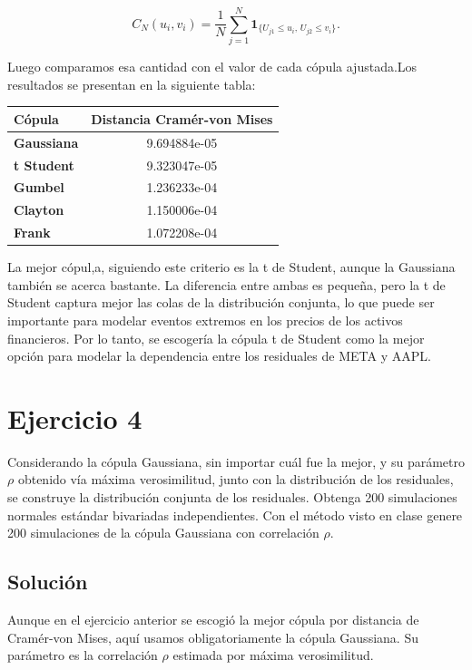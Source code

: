 \documentclass[
]{article}
\begin{document}
\[
C_N(u_i,v_i)=\frac{1}{N}\sum_{j=1}^{N}\mathbf{1}_{\{U_{j1}\leq u_i,\,U_{j2}\leq v_i\}}.
\]

Luego comparamos esa cantidad con el valor de cada cópula ajustada.Los
resultados se presentan en la siguiente tabla:

\begin{longtable}[]{@{}lc@{}}
\toprule\noalign{}
Cópula & Distancia Cramér-von Mises \\
\midrule\noalign{}
\endhead
\bottomrule\noalign{}
\endlastfoot
\textbf{Gaussiana} & 9.694884e-05 \\
\textbf{t Student} & 9.323047e-05 \\
\textbf{Gumbel} & 1.236233e-04 \\
\textbf{Clayton} & 1.150006e-04 \\
\textbf{Frank} & 1.072208e-04 \\
\end{longtable}

La mejor cópul,a, siguiendo este criterio es la t de Student, aunque la
Gaussiana también se acerca bastante. La diferencia entre ambas es
pequeña, pero la t de Student captura mejor las colas de la distribución
conjunta, lo que puede ser importante para modelar eventos extremos en
los precios de los activos financieros. Por lo tanto, se escogería la
cópula t de Student como la mejor opción para modelar la dependencia
entre los residuales de META y AAPL.

\section{Ejercicio 4}\label{ejercicio-4}

Considerando la cópula Gaussiana, sin importar cuál fue la mejor, y su
parámetro \(\rho\) obtenido vía máxima verosimilitud, junto con la
distribución de los residuales, se construye la distribución conjunta de
los residuales. Obtenga 200 simulaciones normales estándar bivariadas
independientes. Con el método visto en clase genere 200 simulaciones de
la cópula Gaussiana con correlación \(\rho\).

\subsection{Solución}\label{soluciuxf3n-3}

Aunque en el ejercicio anterior se escogió la mejor cópula por distancia
de Cramér-von Mises, aquí usamos obligatoriamente la cópula Gaussiana.
Su parámetro es la correlación \(\rho\) estimada por máxima
verosimilitud.
\end{document}

